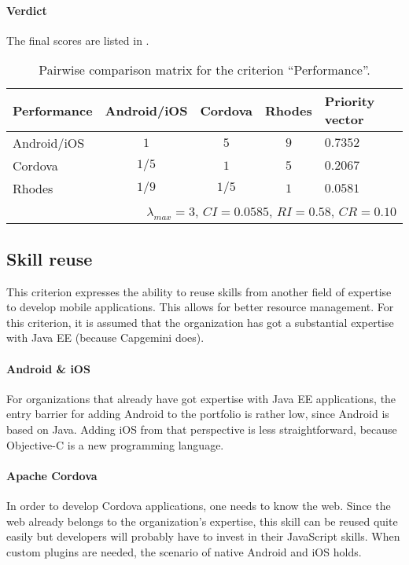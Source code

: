 \paragraph{Verdict} The final scores are listed in .

\begin{table}[h!]
    \begin{center}
        \begin{tabular}{lcccl}
            \hline
            \textbf{Performance} & Android/iOS & Cordova & Rhodes & Priority vector \\
            \hline
            Android/iOS          & $1$         & $5$     & $9$    & $0.7352$        \\
            Cordova              & $1/5$       & $1$     & $5$    & $0.2067$        \\
            Rhodes               & $1/9$       & $1/5$   & $1$    & $0.0581$        \\
            \hline
            \multicolumn{5}{r}{$\lambda_{max} = 3$, $CI = 0.0585$, $RI = 0.58$, $CR = 0.10$}\\
            \hline
        \end{tabular}
        \caption{Pairwise comparison matrix for the criterion ``Performance''.}
        \label{tab:performance}
    \end{center}
\end{table}

\subsection{Skill reuse}

This criterion expresses the ability to reuse skills from another field of expertise to develop mobile applications. This allows for better resource management. For this criterion, it is assumed that the organization has got a substantial expertise with Java EE (because Capgemini does). 

\paragraph{Android \& iOS} For organizations that already have got  expertise with Java EE applications, the entry barrier for adding Android to the portfolio is rather low, since Android is based on Java. Adding iOS from that perspective is less straightforward, because Objective-C is a new programming language.

\paragraph{Apache Cordova} In order to develop Cordova applications, one needs to know the web. Since the web already belongs to the organization's expertise, this skill can be reused quite easily but developers will probably have to invest in their JavaScript skills. When custom plugins are needed, the scenario of native Android and iOS holds.

